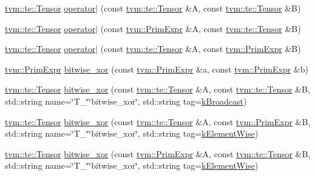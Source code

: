 \begin{DoxyCompactItemize}
\item 
\hyperlink{classtvm_1_1te_1_1Tensor}{tvm\+::te\+::\+Tensor} \hyperlink{namespacetopi_a9ed8c13bf4a785bdfa4eee78c639ffae}{operator$\vert$} (const \hyperlink{classtvm_1_1te_1_1Tensor}{tvm\+::te\+::\+Tensor} \&A, const \hyperlink{classtvm_1_1te_1_1Tensor}{tvm\+::te\+::\+Tensor} \&B)
\item 
\hyperlink{classtvm_1_1te_1_1Tensor}{tvm\+::te\+::\+Tensor} \hyperlink{namespacetopi_a3f4843ae319362c30025db55bd9f88b5}{operator$\vert$} (const \hyperlink{classtvm_1_1PrimExpr}{tvm\+::\+Prim\+Expr} \&A, const \hyperlink{classtvm_1_1te_1_1Tensor}{tvm\+::te\+::\+Tensor} \&B)
\item 
\hyperlink{classtvm_1_1te_1_1Tensor}{tvm\+::te\+::\+Tensor} \hyperlink{namespacetopi_a8dc63da362b9f0a9f81d40e075e47997}{operator$\vert$} (const \hyperlink{classtvm_1_1te_1_1Tensor}{tvm\+::te\+::\+Tensor} \&A, const \hyperlink{classtvm_1_1PrimExpr}{tvm\+::\+Prim\+Expr} \&B)
\item 
\hyperlink{classtvm_1_1PrimExpr}{tvm\+::\+Prim\+Expr} \hyperlink{namespacetopi_ad8c706a823afc470753cabb9007925ec}{bitwise\+\_\+xor} (const \hyperlink{classtvm_1_1PrimExpr}{tvm\+::\+Prim\+Expr} \&a, const \hyperlink{classtvm_1_1PrimExpr}{tvm\+::\+Prim\+Expr} \&b)
\item 
\hyperlink{classtvm_1_1te_1_1Tensor}{tvm\+::te\+::\+Tensor} \hyperlink{namespacetopi_afab59c4a374a18e7bccfe730e308b747}{bitwise\+\_\+xor} (const \hyperlink{classtvm_1_1te_1_1Tensor}{tvm\+::te\+::\+Tensor} \&A, const \hyperlink{classtvm_1_1te_1_1Tensor}{tvm\+::te\+::\+Tensor} \&B, std\+::string name=\char`\"{}T\+\_\+\char`\"{}\char`\"{}bitwise\+\_\+xor\char`\"{}, std\+::string tag=\hyperlink{namespacetopi_a794b9155e9ba9d1c9c42a1cff1fb645f}{k\+Broadcast})
\item 
\hyperlink{classtvm_1_1te_1_1Tensor}{tvm\+::te\+::\+Tensor} \hyperlink{namespacetopi_ad031c8302d5f3f8af44736623513847c}{bitwise\+\_\+xor} (const \hyperlink{classtvm_1_1te_1_1Tensor}{tvm\+::te\+::\+Tensor} \&A, const \hyperlink{classtvm_1_1PrimExpr}{tvm\+::\+Prim\+Expr} \&B, std\+::string name=\char`\"{}T\+\_\+\char`\"{}\char`\"{}bitwise\+\_\+xor\char`\"{}, std\+::string tag=\hyperlink{namespacetopi_ac1b34ed59d38a5f5338bee6b2cad42be}{k\+Element\+Wise})
\item 
\hyperlink{classtvm_1_1te_1_1Tensor}{tvm\+::te\+::\+Tensor} \hyperlink{namespacetopi_a1dfdb80cfffa32f36e1c491c1b050688}{bitwise\+\_\+xor} (const \hyperlink{classtvm_1_1PrimExpr}{tvm\+::\+Prim\+Expr} \&A, const \hyperlink{classtvm_1_1te_1_1Tensor}{tvm\+::te\+::\+Tensor} \&B, std\+::string name=\char`\"{}T\+\_\+\char`\"{}\char`\"{}bitwise\+\_\+xor\char`\"{}, std\+::string tag=\hyperlink{namespacetopi_ac1b34ed59d38a5f5338bee6b2cad42be}{k\+Element\+Wise})

\end{DoxyCompactItemize}

